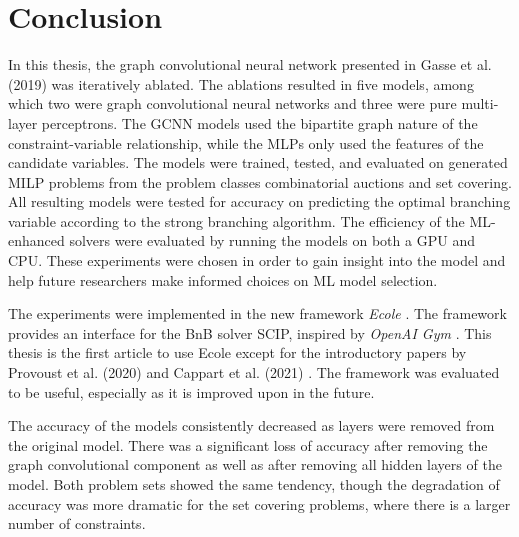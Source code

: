 \chapter{Conclusion}\label{cha:conclusion}

In this thesis, the graph convolutional neural network presented in Gasse et al. (2019) \cite{gasse2019exact} was iteratively ablated. The ablations resulted in five models, among which two were graph convolutional neural networks and three were pure multi-layer perceptrons. The \gls{GCNN} models used the bipartite graph nature of the constraint-variable relationship, while the \gls{MLP}s only used the features of the candidate variables. The models were trained, tested, and evaluated on generated \gls{MILP} problems from the problem classes combinatorial auctions and set covering. All resulting models were tested for accuracy on predicting the optimal branching variable according to the strong branching algorithm. The efficiency of the \gls{ML}-enhanced solvers were evaluated by running the models on both a \gls{GPU} and \gls{CPU}. These experiments were chosen in order to gain insight into the model and help future researchers make informed choices on \gls{ML} model selection. 

The experiments were implemented in the new framework \textit{\gls{Ecole}} \cite{prouvost2020ecole}. The framework provides an interface for the \gls{BnB} solver \gls{SCIP}, inspired by \textit{OpenAI Gym} \cite{brockman2016openai}.  
This thesis is the first article to use \gls{Ecole} except for the introductory papers by Provoust et al. (2020) \cite{prouvost2020ecole} and Cappart et al. (2021) \cite{cappart2021combinatorial}. The framework was evaluated to be useful, especially as it is improved upon in the future.

The accuracy of the models consistently decreased as layers were removed from the original model. There was a significant loss of accuracy after removing the graph convolutional component as well as after removing all hidden layers of the model. Both problem sets showed the same tendency, though the degradation of accuracy was more dramatic for the set covering problems, where there is a larger number of constraints.  

